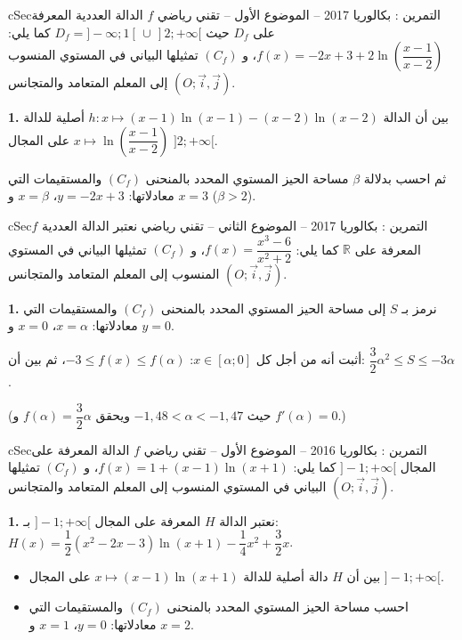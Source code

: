 \documentclass[12pt,a4paper]{article}
\newenvironment{BOX}[2]{\begin{otherlanguage}{english}\begin{arbox}{#1}{#2}}{\end{arbox}\end{otherlanguage}}
\newcounter{exo}
\newenvironment{tamrin}[1]{\stepcounter{exo}\begin{BOX}{cSec}{التمرين \theexo: #1}}{\end{BOX}}
\newcommand{\R}{\mathbb{R}}
\newenvironment{sq}{\begin{itemize}[leftmargin=2.4em,itemsep=3pt]}{\end{itemize}}
\newcommand{\qa}{\item[(أ)]}\newcommand{\qb}{\item[(ب)]}\newcommand{\qc}{\item[(جـ)]}\newcommand{\qd}{\item[(د)]}\newcommand{\qe}{\item[(هـ)]}
\newcommand{\QQ}[1]{\par\smallskip\textbf{#1.} }
\begin{document}
\begin{tamrin}{بكالوريا 2017 -- الموضوع الأول -- تقني رياضي}
$f$ الدالة العددية المعرفة على $D_f$ حيث $D_f=]-\infty;1[\,\cup\,]2;+\infty[$ كما يلي: $f(x)=-2x+3+2\ln\left(\dfrac{x-1}{x-2}\right)$، و $(C_f)$ تمثيلها البياني في المستوي المنسوب إلى المعلم المتعامد والمتجانس $(O;\vec{i},\vec{j})$.

\QQ{1} بين أن الدالة $h:x\mapsto(x-1)\ln(x-1)-(x-2)\ln(x-2)$ أصلية للدالة $x\mapsto\ln\left(\dfrac{x-1}{x-2}\right)$ على المجال $]2;+\infty[$.

ثم احسب بدلالة $\beta$ مساحة الحيز المستوي المحدد بالمنحنى $(C_f)$ والمستقيمات التي معادلاتها: $y=-2x+3$، $x=\beta$ و $x=3$ ($\beta>2$).
\end{tamrin}

\begin{tamrin}{بكالوريا 2017 -- الموضوع الثاني -- تقني رياضي}
نعتبر الدالة العددية $f$ المعرفة على $\R$ كما يلي: $f(x)=\dfrac{x^{3}-6}{x^{2}+2}$، و $(C_f)$ تمثيلها البياني في المستوي المنسوب إلى المعلم المتعامد والمتجانس $(O;\vec{i},\vec{j})$.

\QQ{1} نرمز بـ $S$ إلى مساحة الحيز المستوي المحدد بالمنحنى $(C_f)$ والمستقيمات التي معادلاتها: $x=\alpha$، $x=0$ و $y=0$.

أثبت أنه من أجل كل $x\in[\alpha;0]$: $-3\le f(x)\le f(\alpha)$، ثم بين أن: $\dfrac32\alpha^{2}\le S\le-3\alpha$.

(حيث $-1{,}48<\alpha<-1{,}47$ ويحقق $f(\alpha)=\dfrac32\alpha$ و $f'(\alpha)=0$.)
\end{tamrin}

\begin{tamrin}{بكالوريا 2016 -- الموضوع الأول -- تقني رياضي}
$f$ الدالة المعرفة على المجال $]-1;+\infty[$ كما يلي: $f(x)=1+(x-1)\ln(x+1)$، و $(C_f)$ تمثيلها البياني في المستوي المنسوب إلى المعلم المتعامد والمتجانس $(O;\vec{i},\vec{j})$.

\QQ{1} نعتبر الدالة $H$ المعرفة على المجال $]-1;+\infty[$ بـ: $H(x)=\dfrac12\left(x^{2}-2x-3\right)\ln(x+1)-\dfrac14x^{2}+\dfrac32x$.
\begin{sq}
\qa بين أن $H$ دالة أصلية للدالة $x\mapsto(x-1)\ln(x+1)$ على المجال $]-1;+\infty[$.
\qb احسب مساحة الحيز المستوي المحدد بالمنحنى $(C_f)$ والمستقيمات التي معادلاتها: $y=0$، $x=1$ و $x=2$.
\end{sq}
\end{tamrin}
\end{document}
